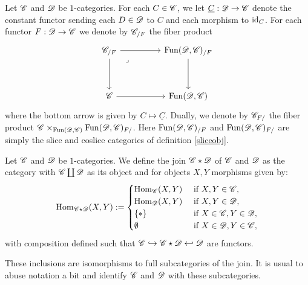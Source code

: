 \documentclass[../../thesis.tex]{subfiles}
\begin{document}
\begin{definition}\label{slicefun}
    Let $\mathscr{C}$ and $\mathscr{D}$ be $1$-categories.
    For each $C\in \mathscr{C}$, we let $\underline{C} : \mathscr{D} \to \mathscr{C}$ denote the constant functor sending each $D\in \mathscr{D}$ to $C$ and each morphism to $\operatorname{id}_C$.
    For each functor $F:\mathscr{D}\to\mathscr{C}$ we denote by $\mathscr{C}_{/F}$ the fiber product
    \[\begin{tikzcd}
            {\C_{/F}} && {\Fun(\D,\C)_{/F}} \\
            \\
            \C && {\Fun(\D,\C)}
            \arrow[from=1-1, to=1-3]
            \arrow[from=1-1, to=3-1]
            \arrow[from=3-1, to=3-3]
            \arrow[from=1-3, to=3-3]
            \arrow["\lrcorner"{anchor=center, pos=0.125}, draw=none, from=1-1, to=3-3]
        \end{tikzcd}\]
    where the bottom arrow is given by $C \mapsto \underline{C}$.
    Dually, we denote by $\mathscr{C}_{F/}$ the fiber product ${\mathscr{C} \times_{\mathrm{Fun}(\mathscr{D},\mathscr{C})}\mathrm{Fun}(\mathscr{D},\mathscr{C})_{F/}}$.
    Here $\mathrm{Fun}(\mathscr{D},\mathscr{C})_{/F}$ and $\mathrm{Fun}(\mathscr{D},\mathscr{C})_{F/}$ are simply the slice and coslice categories of definition \ref{sliceobj}.
\end{definition}
\begin{definition}
    Let $\mathscr{C}$ and $\mathscr{D}$ be $1$-categories.
    We define the join $\mathscr{C} \star \mathscr{D}$ of $\mathscr{C}$ and $\mathscr{D}$ as the category with $\mathscr{C} \coprod \mathscr{D}$ as its object and for objects $X, Y$ morphisms given by:
    \[
        \mathrm{Hom}_{\mathscr{C} \star \mathscr{D}}(X,Y) : =
        \begin{cases}
            \mathrm{Hom}_{\mathscr{C}}(X,Y) & \text{ if } X,Y \in \mathscr{C},         \\
            \mathrm{Hom}_{\mathscr{D}}(X,Y) & \text{ if } X,Y \in \mathscr{D},         \\
            \{*\}          & \text{ if } X \in \mathscr{C}, Y \in \mathscr{D}, \\
            \emptyset      & \text{ if } X \in \mathscr{D}, Y\in \mathscr{C},
        \end{cases}
    \]
    with composition defined such that $\mathscr{C} \hookrightarrow \mathscr{C} \star \mathscr{D} \hookleftarrow \mathscr{D}$ are functors.
\end{definition}
\begin{remark}
    These inclusions are isomorphisms to full subcategories of the join.
    It is usual to abuse notation a bit and identify $\mathscr{C}$ and $\mathscr{D}$ with these subcategories.
\end{remark}
\end{document}
